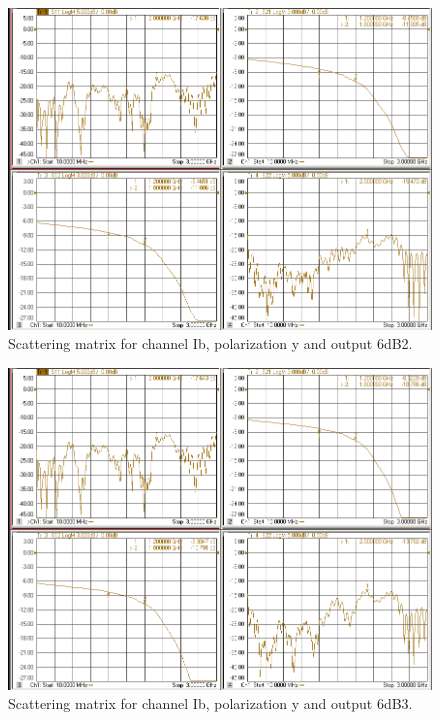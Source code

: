 \documentclass[12pt,a4paper,oneside]{article}
\begin{document}
\begin{figure}[H]
\centering
\includegraphics[width=0.9\linewidth]{VNA_results/Iby_6dB2.png}
\caption{Scattering matrix for channel Ib, polarization y and output 6dB2.}
\label{fig:Iby_6dB2}
\end{figure}


\begin{figure}[H]
\centering
\includegraphics[width=0.9\linewidth]{VNA_results/Iby_6dB3.png}
\caption{Scattering matrix for channel Ib, polarization y and output 6dB3.}
\label{fig:Iby_6dB3}
\end{figure}
\end{document}
